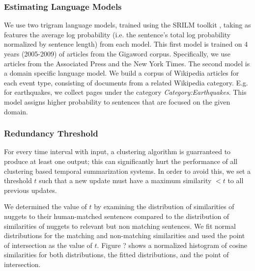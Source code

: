 \subsubsection{Estimating Language Models}
We use two trigram language models, trained using the SRILM toolkit
\cite{stolcke2002srilm}, taking as features the average log probability (i.e.
the sentence's total log probability normalized by sentence length) from each
model.  This first model is trained on 4 years (2005-2009) of articles from the
Gigaword corpus.  Specifically, we use articles from the Associated Press and
the New York Times. The second model is a domain specific language model.
We build a corpus of Wikipedia articles for each event type, consisting of documents from a related Wikipedia category. E.g. for earthquakes, we collect pages under the category \emph{Category:Earthquakes}. This model assigns higher probability to sentences that are focused on the given domain.



\subsubsection{Redundancy Threshold}

For every time interval with input, a clustering algorithm is
guarranteed to produce at least one output; 
this can significantly hurt the performance of all clustering based 
temporal summarization systems. In order to avoid this, we set a threshold $t$
such that a new update must have a maximum similarity $< t$ to all previous 
updates.

We determined the value of $t$ by examining the distribution of similarities
of nuggets to their human-matched sentences compared to the distribution
of similarities of nuggets to relevant but non matching sentences. We fit
normal distributions for the matching and non-matching similarities and
used the point of intersection as the value of $t$.
Figure ? shows a normalized histogram of cosine similarities for both 
distributions, the fitted distributions, and the point of intersection.

